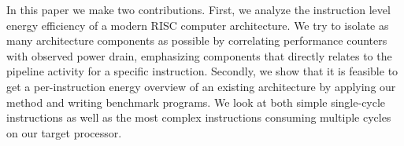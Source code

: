 In this paper we make two contributions. First, we analyze the instruction level
energy efficiency of a modern RISC computer architecture. We try to isolate as
many architecture components as possible by correlating performance counters
with observed power drain, emphasizing components that directly relates to the
pipeline activity for a specific instruction. Secondly, we show that it is
feasible to get a per-instruction energy overview of an existing architecture by
applying our method and writing benchmark programs. We look at both simple
single-cycle instructions as well as the most complex instructions consuming
multiple cycles on our target processor.



